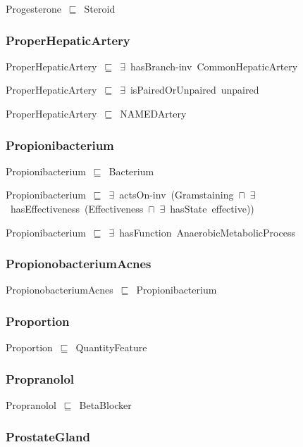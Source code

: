 \documentclass{article}
\begin{document}
Progesterone~\ensuremath{\sqsubseteq}~Steroid~

\subsubsection*{ProperHepaticArtery}

ProperHepaticArtery~\ensuremath{\sqsubseteq}~\ensuremath{\exists}~hasBranch-inv~CommonHepaticArtery~

ProperHepaticArtery~\ensuremath{\sqsubseteq}~\ensuremath{\exists}~isPairedOrUnpaired~unpaired~

ProperHepaticArtery~\ensuremath{\sqsubseteq}~NAMEDArtery~

\subsubsection*{Propionibacterium}

Propionibacterium~\ensuremath{\sqsubseteq}~Bacterium~

Propionibacterium~\ensuremath{\sqsubseteq}~\ensuremath{\exists}~actsOn-inv~(Gramstaining~\ensuremath{\sqcap}~\ensuremath{\exists}~hasEffectiveness~(Effectiveness~\ensuremath{\sqcap}~\ensuremath{\exists}~hasState~effective))~

Propionibacterium~\ensuremath{\sqsubseteq}~\ensuremath{\exists}~hasFunction~AnaerobicMetabolicProcess~

\subsubsection*{PropionobacteriumAcnes}

PropionobacteriumAcnes~\ensuremath{\sqsubseteq}~Propionibacterium~

\subsubsection*{Proportion}

Proportion~\ensuremath{\sqsubseteq}~QuantityFeature~

\subsubsection*{Propranolol}

Propranolol~\ensuremath{\sqsubseteq}~BetaBlocker~

\subsubsection*{ProstateGland}
\end{document}
